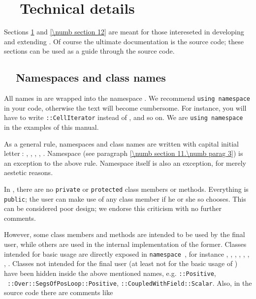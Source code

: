 
\chapter{~~Technical details}\label{\numb section 11}

Sections \ref{\numb section 11} and \ref{\numb section 12} are meant for those intereseted
in developing and extending \maniFEM.
Of course the ultimate documentation is the source code; these sections can be used as
a guide through the source code.


\section{~~Namespaces and class names}\label{\numb section 11.\numb parag 1}

All names in {\maniFEM} are wrapped into the namespace {\small\tt{}}.
We recommend {\small\tt using namespace } in your code,
otherwise the text will become cumbersome.
For instance, you will have to write {\small\tt{}::CellIterator} instead of
{\small\tt{}}, and so on.
We are {\small\tt using namespace } in the examples of this manual.

As a general rule, namespaces and class names are written with capital initial
letter$\;$:
{\small\tt{}}, {\small\tt{}}, {\small\tt{}},
{\small\tt{}}, {\small\tt{}}.
Namespace {\small\tt{}} (see paragraph \ref{\numb section 11.\numb parag 3})
is an exception to the above rule.
Namespace {\small\tt{}} itself is also an exception, for merely aestetic reasons.

In \maniFEM, there are no {\small\tt private} or {\small\tt protected} class members or methods.
Everything is {\small\tt public};
the user can make use of any class member if he or she so chooses.
This can be considered poor design; we endorse this criticism with no further comments.

However, some class members and methods are intended to be used by the final user,
while others are used in the internal implementation of the former.
Classes \hbox{intended} for basic usage are directly exposed in {\small\tt namespace
}, for instance
{\small\tt{}}, {\small\tt{}}, {\small\tt{}},
{\small\tt{}}, {\small\tt{}}, {\small\tt{}},
{\small\tt{}}, {\small\tt{}}.
Classes not intended for the final user (at least not for the basic usage of \maniFEM)
have been hidden inside the above mentioned names, e.g. {\small\tt{}::Positive},
\ {\small\tt{}::Over::SegsOfPosLoop::Positive},
\hbox{\small\tt{}::CoupledWithField::Scalar}.
Also, in the source code there are comments like

